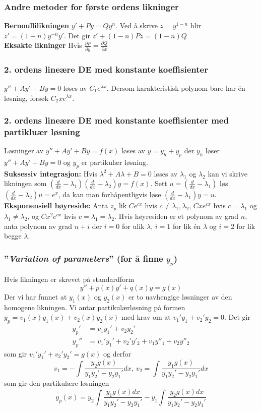 \documentclass[a4paper, norsk, 8pt]{article}
\newcommand{\EQU}[1] { \begin{equation*} \begin{split}
#1  
\end{split} \end{equation*} }
\newcommand{\PAR}[2]{ \frac{\partial #1}{\partial #2}}
\newcommand{\DIFF}[2]{ \frac{d#1}{d#2} }
\begin{document}
\begin{multicols*}{2}
\subsubsection*{\small Andre metoder for første ordens likninger}
\textbf{Bernoullilikningen} $y'+Py=Qy^n$. Ved å skrive $z=y^{1-n}$ blir $z'=(1-n)y^{-n}y'$. Det gir $z'+(1-n)Pz=(1-n)Q$ \\
\textbf{Eksakte likninger} Hvis $\PAR{P}{y}=\PAR{Q}{x}$


\subsubsection*{\small 2. ordens lineære DE med konstante koeffisienter}
$y''+Ay'+By=0$ løses av $C_1e^{\lambda x}$. Dersom karakteristisk polynom bare har én løsning, forsøk $C_2xe^{\lambda x}$.

\subsubsection*{\small 2. ordens lineære DE med konstante koeffisienter med partikluær løsning }
Løsninger av $y''+Ay'+By=f(x)$ løses av $y=y_h+y_p$ der $y_h$ løser $y''+Ay'+By=0$ og $y_p$ er partikulær løsning. \\
\textbf{Suksessiv integrasjon:} Hvis $\lambda^2+A\lambda+B=0$ løses av $\lambda_1$ og $\lambda_2$ kan vi skrive likningen som $\left(\DIFF{}{x}-\lambda_1\right)\left(\DIFF{}{x}-\lambda_2\right)y=f(x)$. Sett $u=\left(\DIFF{}{x}-\lambda_1\right)$ løs $\left(\DIFF{}{x}-\lambda_2\right)u=e^x$, da kan man forhåpentligvis løse $\left(\DIFF{}{x}-\lambda_1\right)y=u$. \\
\textbf{Eksponensiell høyreside:} Anta $z_p$ lik $Ce^{cx}$ hvis $c\neq\lambda_1,\lambda_2$, $Cxe^{cx}$ hvis $c=\lambda_1$ og $\lambda_1\neq \lambda_2$, og $Cx^2e^{cx}$ hvis $c=\lambda_1=\lambda_2$. Hvis høyresiden er et polynom av grad $n$, anta polynom av grad $n+i$ der $i=0$ for ulik $\lambda$, $i=1$ for lik én $\lambda$ og $i=2$ for lik begge $\lambda$. 


\subsubsection*{\small ''\textit{Variation of parameters}'' (for å finne $y_p$)}
Hvis likningen er skrevet på standardform 
\[
y''+p(x)y'+q(x)y=g(x)
\]
Der vi har funnet at $y_1(x)$ og $y_2(x)$ er to uavhengige løsninger av den homogene likningen. Vi antar partikulærløsning på formen $y_p=v_1(x)y_1(x)+v_2(x)y_2(x)$ med krav om at $v_1'y_1+v_2'y_2=0$. Det gir
\EQU{
y_p'  & =v_1y_1'+v_2y_2' \\
y_p'' & =v_1'y_1'+v_2'y'_2+v_1y''_1+v_2y''_2
}
som gir $v_1'y_1'+v_2'y_2'=g(x)$ og derfor
\[
v_1=-\int\frac{y_2g(x)}{y_1y_2'-y_2y_1'}dx, \ v_2=\int\frac{y_1g(x)}{y_1y_2'-y_2y_1'}dx 
\]
som gir den partikulære løsningen
\[
y_p(x)=y_2\int \frac{y_1 g(x) dx}{y_1y_2'-y_2y_1'}-y_1\int \frac{y_2 g(x) dx}{y_1y_2'-y_2y_1'}
\]


\end{multicols*}
\end{document}
